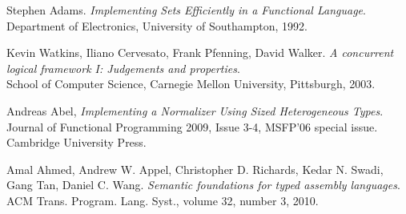 \documentclass[12pt, a4paper, titlepage]{article}
\begin{document}
\begin{thebibliography}{4} 
  
  Stephen Adams. \emph{Implementing Sets Efficiently in a Functional Language}.\\
  Department of Electronics, University of Southampton, 1992.
  
  Kevin Watkins, Iliano Cervesato, Frank Pfenning, David Walker. \emph{A concurrent logical framework I: Judgements and properties}.\\
  School of Computer Science, Carnegie Mellon University, Pittsburgh, 2003.


  Andreas Abel, \emph{Implementing a Normalizer Using Sized Heterogeneous Types}.\\
  Journal of Functional Programming 2009, Issue 3-4, MSFP'06 special issue. Cambridge University Press. 

  Amal Ahmed, Andrew W. Appel, Christopher D. Richards, Kedar N. Swadi, Gang Tan, Daniel C. Wang. \emph{Semantic foundations for typed assembly languages}.\\
  ACM Trans. Program. Lang. Syst., volume 32, number 3, 2010.


\end{thebibliography}


\clearpage
\end{document}
